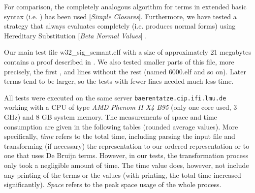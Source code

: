 \documentclass[submission,copyright,creativecommons]{eptcs}
\begin{document}
For comparison, the completely analogous algorithm for terms in
extended basic syntax (i.e. ) has been used [\emph{Simple
  Closures}]. Furthermore, we have tested a strategy that always
evaluates completely (i.e. produces  normal forms) using
Hereditary Substitution [\emph{Beta Normal Values}]
\cite{watkins:concurrentlftr}.

Our main test file \textsf{w32\_sig\_semant.elf} with a size of
approximately 21 megabytes contains a proof described in
\cite{appel:toplas10}. We also tested smaller parts of this file, more
precisely, the first ,  and  lines without the
rest (named \textsf{6000.elf} and so on). Later terms tend to be
larger, so the tests with fewer lines needed much less time.

All tests were executed on the same server 
\mbox{\texttt{baerentatze.cip.ifi.lmu.de}}
working with a CPU of type \emph{AMD Phenom II X4 B95} (only
one core used, 3 GHz) and 8 GB system memory. The measurements
of space and time consumption are given in the following tables (rounded
average values). More specifically, \emph{time} refers to the total time, including parsing the input file and transforming (if necessary) the representation to our ordered representation or to one that uses De Bruijn terms. However, in our tests, the transformation process only took a negligible amount of time. The time value does, however, not include any printing of the terms or the values (with printing, the total time increased significantly). \emph{Space} refers to the peak space usage of the whole process.
\end{document}
